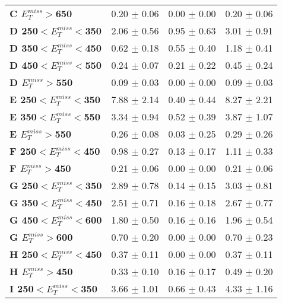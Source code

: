 \begin{table}[h]
\begin{center}
\begin{tabular}{|l|ccc|}
\textbf{ C $E_T^{miss}>$650}     & 0.20 $\pm$ 0.06       & 0.00 $\pm$ 0.00       & 0.20 $\pm$ 0.06       \\
\textbf{ D 250$<E_T^{miss}<$350}         & 2.06 $\pm$ 0.56       & 0.95 $\pm$ 0.63       & 3.01 $\pm$ 0.91       \\
\textbf{ D 350$<E_T^{miss}<$450}         & 0.62 $\pm$ 0.18       & 0.55 $\pm$ 0.40       & 1.18 $\pm$ 0.41       \\
\textbf{ D 450$<E_T^{miss}<$550}         & 0.24 $\pm$ 0.07       & 0.21 $\pm$ 0.22       & 0.45 $\pm$ 0.24       \\
\textbf{ D $E_T^{miss}>$550}     & 0.09 $\pm$ 0.03       & 0.00 $\pm$ 0.00       & 0.09 $\pm$ 0.03       \\
\textbf{ E 250$<E_T^{miss}<$350}         & 7.88 $\pm$ 2.14       & 0.40 $\pm$ 0.44       & 8.27 $\pm$ 2.21       \\
\textbf{ E 350$<E_T^{miss}<$550}         & 3.34 $\pm$ 0.94       & 0.52 $\pm$ 0.39       & 3.87 $\pm$ 1.07       \\
\textbf{ E $E_T^{miss}>$550}     & 0.26 $\pm$ 0.08       & 0.03 $\pm$ 0.25       & 0.29 $\pm$ 0.26       \\
\textbf{ F 250$<E_T^{miss}<$450}         & 0.98 $\pm$ 0.27       & 0.13 $\pm$ 0.17       & 1.11 $\pm$ 0.33       \\
\textbf{ F $E_T^{miss}>$450}     & 0.21 $\pm$ 0.06       & 0.00 $\pm$ 0.00       & 0.21 $\pm$ 0.06       \\
\textbf{ G 250$<E_T^{miss}<$350}         & 2.89 $\pm$ 0.78       & 0.14 $\pm$ 0.15       & 3.03 $\pm$ 0.81       \\
\textbf{ G 350$<E_T^{miss}<$450}         & 2.51 $\pm$ 0.71       & 0.16 $\pm$ 0.18       & 2.67 $\pm$ 0.77       \\
\textbf{ G 450$<E_T^{miss}<$600}         & 1.80 $\pm$ 0.50       & 0.16 $\pm$ 0.16       & 1.96 $\pm$ 0.54       \\
\textbf{ G $E_T^{miss}>$600}     & 0.70 $\pm$ 0.20       & 0.00 $\pm$ 0.00       & 0.70 $\pm$ 0.23       \\
\textbf{ H 250$<E_T^{miss}<$450}         & 0.37 $\pm$ 0.11       & 0.00 $\pm$ 0.00       & 0.37 $\pm$ 0.11       \\
\textbf{ H $E_T^{miss}>$450}     & 0.33 $\pm$ 0.10       & 0.16 $\pm$ 0.17       & 0.49 $\pm$ 0.20       \\
\hline
\textbf{ I 250$<E_T^{miss}<$350}         & 3.66 $\pm$ 1.01       & 0.66 $\pm$ 0.43       & 4.33 $\pm$ 1.16       \\

\end{tabular}
\end{center}
\end{table}

